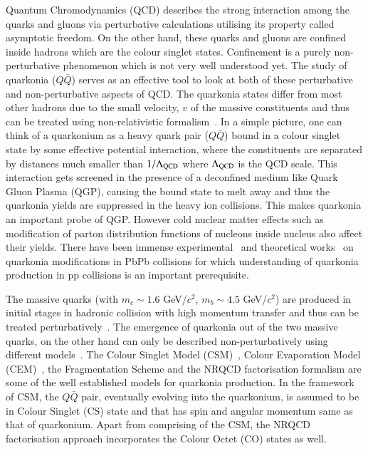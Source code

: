 \documentclass[review]{elsarticle}
\begin{document}
Quantum Chromodynamics (QCD) describes the strong interaction among the
quarks and gluons via perturbative calculations utilising its property called asymptotic freedom.
On the other hand, these quarks and gluons are confined inside hadrons which are the colour singlet states.
Confinement is a purely non-perturbative phenomenon which is not very well understood yet. 
The study of quarkonia ($Q\bar{Q}$) serves as an effective 
tool to look at  both of these perturbative and non-perturbative aspects of QCD.
The quarkonia states differ from most other hadrons due to the small velocity, $v$ of the massive
constituents and thus can be treated using non-relativistic formalism~\cite{Povh:1995mua,Ikhdair:2005jf}. 
In a simple picture, one can think of a quarkonium as a heavy quark pair ($Q\bar{Q}$) bound
in a colour singlet state by some effective potential interaction, where the constituents are 
separated by distances much smaller than $1/\Lambda_{\rm QCD}$ where $\Lambda_{\rm QCD}$
is the QCD scale. This interaction gets screened 
in the presence of a deconfined medium like Quark Gluon Plasma (QGP), causing 
the bound state to melt away and thus the quarkonia yields are suppressed in the 
heavy ion collisions. This makes quarkonia an important probe of QGP. However cold nuclear matter 
effects such as modification of parton distribution functions of nucleons inside nucleus also 
affect their yields.
There have been immense experimental~\cite{Sirunyan:2017isk,Sirunyan:2018nsz,Acharya:2019iur,Acharya:2018mni}
and theoretical works~\cite{Strickland:2011mw,Song:2011nu,Kumar:2014kfa,Kumar:2019xdj} on
quarkonia modifications in PbPb collisions for which understanding of quarkonia
production in pp collisions is an important prerequisite.

The massive quarks (with $m_c\sim 1.6$ GeV/$c^2$, $m_b\sim 4.5$ GeV/$c^2$) are produced
in initial stages in hadronic collision with high momentum transfer and thus
can be treated perturbatively~\cite{Nason:1989zy}. The emergence of quarkonia
out of the two massive quarks, on the other hand can only be described non-perturbatively using different
models~\cite{Bodwin:1994jh,Brambilla:2014jmp}.
The Colour Singlet Model (CSM)~\cite{Einhorn:1975ua,Berger:1980ni},
Colour Evaporation Model (CEM)~\cite{Fritzsch:1977ay,Amundson:1995em}, the Fragmentation Scheme and 
the NRQCD factorisation formalism are some of the well established models for quarkonia production.
In the framework of CSM, the $Q\bar{Q}$ pair, eventually evolving into the quarkonium,
is assumed to be in Colour Singlet (CS) state and that has spin and 
angular momentum same as that of quarkonium.
Apart from comprising of the CSM, the NRQCD factorisation approach incorporates 
the Colour Octet (CO) states as well.
\end{document}
